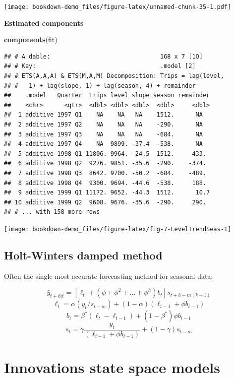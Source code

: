 \documentclass[]{book}
\newenvironment{Shaded}{\begin{snugshade}}{\end{snugshade}}
\newcommand{\KeywordTok}[1]{\textcolor[rgb]{0.13,0.29,0.53}{\textbf{#1}}}
\newcommand{\NormalTok}[1]{#1}
\begin{document}
\texttt{[image: bookdown-demo\_files/figure-latex/unnamed-chunk-35-1.pdf]}

\textbf{Estimated components}

\begin{Shaded}
\begin{Highlighting}[]
\KeywordTok{components}\NormalTok{(fit)}
\end{Highlighting}
\end{Shaded}

\begin{verbatim}
## # A dable:                               168 x 7 [1Q]
## # Key:                                   .model [2]
## # ETS(A,A,A) & ETS(M,A,M) Decomposition: Trips = lag(level,
## #   1) + lag(slope, 1) + lag(season, 4) + remainder
##    .model   Quarter  Trips level slope season remainder
##    <chr>      <qtr>  <dbl> <dbl> <dbl>  <dbl>     <dbl>
##  1 additive 1997 Q1    NA    NA   NA    1512.      NA  
##  2 additive 1997 Q2    NA    NA   NA    -290.      NA  
##  3 additive 1997 Q3    NA    NA   NA    -684.      NA  
##  4 additive 1997 Q4    NA  9899. -37.4  -538.      NA  
##  5 additive 1998 Q1 11806. 9964. -24.5  1512.     433. 
##  6 additive 1998 Q2  9276. 9851. -35.6  -290.    -374. 
##  7 additive 1998 Q3  8642. 9700. -50.2  -684.    -489. 
##  8 additive 1998 Q4  9300. 9694. -44.6  -538.     188. 
##  9 additive 1999 Q1 11172. 9652. -44.3  1512.      10.7
## 10 additive 1999 Q2  9608. 9676. -35.6  -290.     290. 
## # ... with 158 more rows
\end{verbatim}

\texttt{[image: bookdown-demo\_files/figure-latex/fig-7-LevelTrendSeas-1]}

\hypertarget{holt-winters-damped-method}{%
\subsection{Holt-Winters damped method}\label{holt-winters-damped-method}}

Often the single most accurate forecasting method for seasonal data:

\[\hat{y}_{t+h|t} = [\ell_{t} + (\phi+\phi^2 + \dots + \phi^{h})b_{t}]s_{t+h-m(k+1)}\]
\[\ell_{t} = \alpha(y_{t} / s_{t-m}) + (1 - \alpha)(\ell_{t-1} + \phi b_{t-1})\]
\[b_{t} = \beta^*(\ell_{t} - \ell_{t-1}) + (1 - \beta^*)\phi b_{t-1}\]
\[s_{t} = \gamma \frac{y_{t}}{(\ell_{t-1} + \phi b_{t-1})} + (1 - \gamma)s_{t-m}\]

\newpage

\hypertarget{innovations-state-space-models}{%
\section{Innovations state space models}\label{innovations-state-space-models}}
\end{document}
